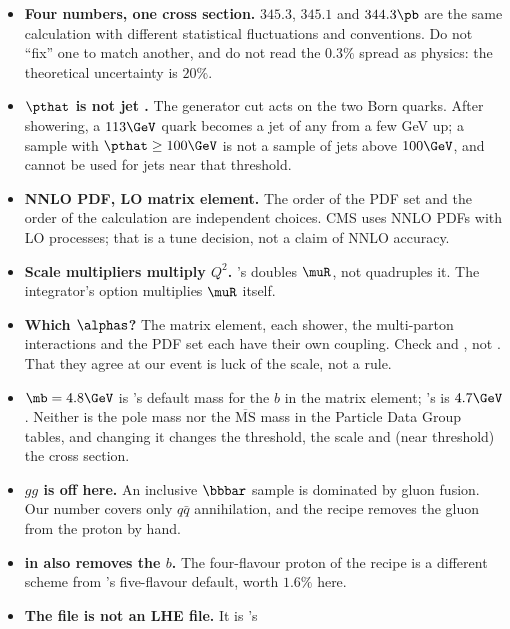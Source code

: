 \begin{pitfalls}
\begin{itemize}[nosep]
  \item \textbf{Four numbers, one cross section.} $345.3$, $345.1$ and
    $344.3\pb$ are the same calculation with different statistical
    fluctuations and conventions. Do not ``fix'' one to match another, and
    do not read the $0.3\%$ spread as physics: the theoretical uncertainty
    is $20\%$.
  \item \textbf{$\pthat$ is not jet \pt.} The generator cut acts on the two
    Born quarks. After showering, a $113\GeV$ quark becomes a jet of any \pt
    from a few GeV up; a sample with $\pthat\ge100\GeV$ is not a sample of
    jets above $100\GeV$, and cannot be used for jets near that threshold.
  \item \textbf{NNLO PDF, LO matrix element.} The order of the PDF set and the
    order of the calculation are independent choices. CMS uses NNLO PDFs with
    LO \PYTHIA processes; that is a tune decision, not a claim of NNLO accuracy.
  \item \textbf{Scale multipliers multiply $Q^2$.} \PYTHIA's
     doubles $\muR$, not quadruples it. The
    integrator's  option multiplies $\muR$ itself.
  \item \textbf{Which $\alphas$?} The matrix element, each shower, the
    multi-parton interactions and the PDF set each have their own coupling.
    Check  and , not
    . That they agree at our event is luck of the scale, not a
    rule.
  \item \textbf{$\mb=4.8\GeV$} is \PYTHIA's default mass for the $b$ in the
    matrix element; \MG's is $4.7\GeV$. Neither is the pole mass nor the
    $\overline{\mathrm{MS}}$ mass in the Particle Data Group tables, and
    changing it changes the threshold, the scale and (near threshold) the
    cross section.
  \item \textbf{$gg$ is off here.} An inclusive $\bbbar$ sample is
    dominated by gluon fusion. Our number covers only $q\bar q$ annihilation,
    and the \MG recipe removes the gluon from the proton by hand.
  \item \textbf{ in \MG also removes the $b$.} The
    four-flavour proton of the recipe is a different scheme from \PYTHIA's
    five-flavour default, worth $1.6\%$ here.
  \item \textbf{The  file is not an LHE file.} It is \PYTHIA's

\end{itemize}
\end{pitfalls}

